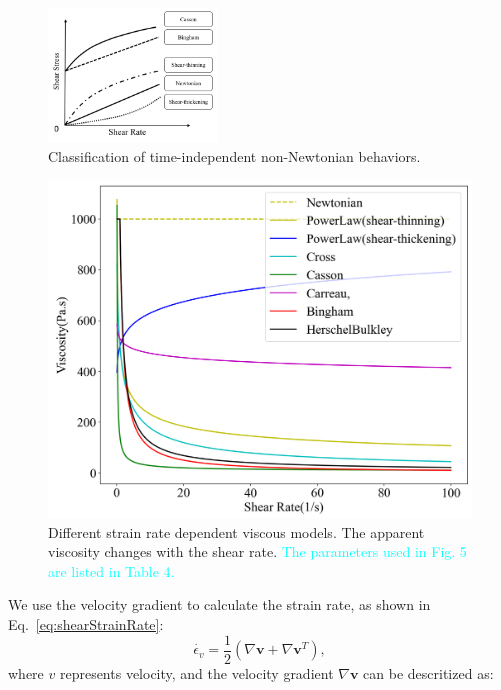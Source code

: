 \documentclass[10pt,journal,compsoc]{IEEEtran}
\newcommand{\revised}[1]{{\textcolor{cyan}{#1}}}
\begin{document}
\begin{figure}[htbp]
	\centering
	\includegraphics[width=0.4\textwidth]{pics/rheogram-new.png}
	\caption{Classification of time-independent non-Newtonian behaviors.}
	\label{fig:rheogram}
\end{figure}





\begin{figure}[htbp]
	\centering
	\includegraphics[width=1\linewidth]{pics/linechart.png}
	\caption{Different strain rate dependent viscous models. The apparent viscosity changes with the shear rate. \revised{The parameters used in Fig. 5 are listed in Table 4.}}     \label{fig:6NonNewtonsLineChart}
\end{figure}

We use the velocity gradient to calculate the strain rate, as shown in Eq.~\ref{eq:shearStrainRate}:
\begin{equation}
	\dot{\epsilon_v}=\frac{1}{2} \left(\nabla \mathbf{v}+\nabla \mathbf{v}^T\right) \label{eq:shearStrainRate},
\end{equation}
where $v$ represents velocity, and the velocity gradient $\nabla \mathbf{v}$ can be descritized as:
\end{document}
